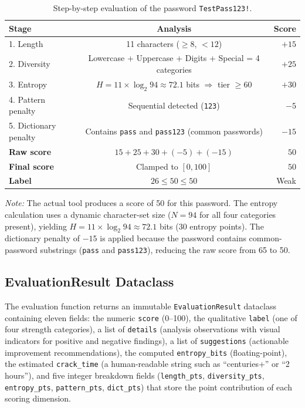 \begin{table}[H]
\centering
\caption{Step-by-step evaluation of the password \texttt{TestPass123!}.}
\label{tab:worked_example}
\begin{tabularx}{\textwidth}{lcr}
\toprule
\textbf{Stage} & \textbf{Analysis} & \textbf{Score} \\
\midrule
1. Length & 11 characters ($\geq 8$, $< 12$) & $+15$ \\
2. Diversity & Lowercase + Uppercase + Digits + Special = 4 categories & $+25$ \\
3. Entropy & $H = 11 \times \log_2 94 \approx 72.1$ bits $\Rightarrow$ tier $\geq 60$ & $+30$ \\
4. Pattern penalty & Sequential detected (\texttt{123}) & $-5$ \\
5. Dictionary penalty & Contains \texttt{pass} and \texttt{pass123} (common passwords) & $-15$ \\
\midrule
\textbf{Raw score} & $15 + 25 + 30 + (-5) + (-15)$ & $50$ \\
\textbf{Final score} & Clamped to $[0, 100]$ & $50$ \\
\textbf{Label} & $26 \leq 50 \leq 50$ & Weak \\
\bottomrule
\end{tabularx}
\end{table}

\noindent \textit{Note:} The actual tool produces a score of 50 for this password. The entropy calculation uses a dynamic character-set size ($N = 94$ for all four categories present), yielding $H = 11 \times \log_2 94 \approx 72.1$ bits (30 entropy points). The dictionary penalty of $-15$ is applied because the password contains common-password substrings (\texttt{pass} and \texttt{pass123}), reducing the raw score from 65 to 50.

\subsection{EvaluationResult Dataclass}

The evaluation function returns an immutable \texttt{EvaluationResult} dataclass containing eleven fields: the numeric \texttt{score} (0--100), the qualitative \texttt{label} (one of four strength categories), a list of \texttt{details} (analysis observations with visual indicators for positive and negative findings), a list of \texttt{suggestions} (actionable improvement recommendations), the computed \texttt{entropy\_bits} (floating-point), the estimated \texttt{crack\_time} (a human-readable string such as ``centuries+'' or ``2 hours''), and five integer breakdown fields (\texttt{length\_pts}, \texttt{diversity\_pts}, \texttt{entropy\_pts}, \texttt{pattern\_pts}, \texttt{dict\_pts}) that store the point contribution of each scoring dimension.

